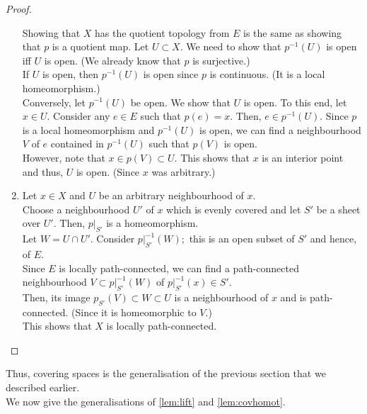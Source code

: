 \documentclass[12pt]{article}
\begin{document}
\begin{proof}
\begin{enumerate}
		Showing that $X$ has the quotient topology from $E$ is the same as showing that $p$ is a quotient map. Let $U \subset X.$ We need to show that $p^{-1}(U)$ is open iff $U$ is open. (We already know that $p$ is surjective.)\\
		If $U$ is open, then $p^{-1}(U)$ is open since $p$ is continuous. (It is a local homeomorphism.)\\
		Conversely, let $p^{-1}(U)$ be open. We show that $U$ is open. To this end, let $x \in U.$ Consider any $e \in E$ such that $p(e) = x.$ Then, $e \in p^{-1}(U).$ Since $p$ is a local homeomorphism and $p^{-1}(U)$ is open, we can find a neighbourhood $V$ of $e$ contained in $p^{-1}(U)$ such that $p(V)$ is open.\\
		However, note that $x \in p(V) \subset U.$ This shows that $x$ is an interior point and thus, $U$ is open. (Since $x$ was arbitrary.)
		\item Let $x \in X$ and $U$ be an arbitrary neighbourhood of $x.$\\
		Choose a neighbourhood $U'$ of $x$ which is evenly covered and let $S'$ be a sheet over $U'.$ Then, $p|_{S'}$ is a homeomorphism. \\
		Let $W = U \cap U'.$ Consider $p|_{S'}^{-1}(W);$ this is an open subset of $S'$ and hence, of $E.$\\
		Since $E$ is locally path-connected, we can find a path-connected neighbourhood $V \subset p|_{S'}^{-1}(W)$ of $p|_{S'}^{-1}(x) \in S'.$\\
		Then, its image $p_{S'}(V) \subset W \subset U$ is a neighbourhood of $x$ and is path-connected. (Since it is homeomorphic to $V.$)\\
		This shows that $X$ is locally path-connected. \qedhere
	\end{enumerate}
\end{proof}

Thus, covering spaces is the generalisation of the previous section that we described earlier.\\
We now give the generalisations of \cref{lem:lift} and \cref{lem:covhomot}.
\end{document}
